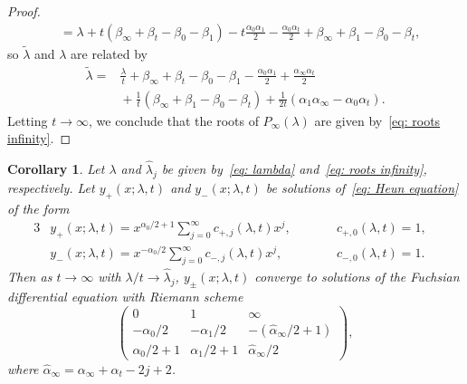 \documentclass[11pt]{article}
\numberwithin{equation}{section}
\numberwithin{equation}{section}
\newtheorem{Corollary}[Theorem]{Corollary}
\def\wt#1{\widetilde{#1}}
\begin{document}
\begin{proof}
\begin{align*}
 &{}=\lambda+t(\beta_\infty+\beta_t-\beta_0-\beta_1)-t\frac{\alpha_0\alpha_1}{2}
 -\frac{\alpha_0\alpha_t}{2}+\beta_\infty+\beta_1-\beta_0-\beta_t, \end{align*}
 so $\wt\lambda$ and $\lambda$ are related by
 {\allowdisplaybreaks
 \begin{align*}
 \wt\lambda={}&\frac\lambda t+\beta_\infty+\beta_t-\beta_0-\beta_1
 -\frac{\alpha_0\alpha_1}2+\frac{\alpha_\infty\alpha_t}2 \\
 &{}+\frac1t(\beta_\infty+\beta_1-\beta_0-\beta_t)
 +\frac1{2t}(\alpha_1\alpha_\infty-\alpha_0\alpha_t).
 \end{align*}
 }%
 Letting $t\to\infty$, we conclude that the roots of
 $P_\infty(\lambda)$ are given by~\eqref{eq: roots infinity}.
\end{proof}

\begin{Corollary}
 \label{corollary: limiting equations}
 Let $\lambda$ and $\hat\lambda_j$ be given by~\eqref{eq: lambda} and~\eqref{eq: roots infinity}, respectively.
 Let $y_+(x;\lambda,t)$ and $y_-(x;\lambda,t)$ be solutions of~\eqref{eq: Heun equation} of the form
\begin{alignat*}{3}
 & y_+(x;\lambda,t)=x^{\alpha_0/2+1}\sum_{j=0}^\infty
 c_{+,j}(\lambda,t)x^j, \qquad && c_{+,0}(\lambda,t)=1,&
\\
 & y_-(x;\lambda,t)=x^{-\alpha_0/2}\sum_{j=0}^\infty
 c_{-,j}(\lambda,t)x^j, \qquad && c_{-,0}(\lambda,t)=1.&
\end{alignat*}
 Then as $t\to\infty$ with $\lambda/t\to\hat\lambda_j$,
 $y_\pm(x;\lambda,t)$ converge to solutions of the Fuchsian
 differential equation with Riemann scheme
 \begin{equation} \label{eq: RS infinity}
 \begin{pmatrix}
 0 & 1 & \infty \\
 -\alpha_0/2 & -\alpha_1/2 & -(\hat\alpha_\infty/2+1) \\
 \alpha_0/2+1 & \alpha_1/2+1 & \hat\alpha_\infty/2
 \end{pmatrix},
 \end{equation}
 where $\hat\alpha_\infty=\alpha_\infty+\alpha_t-2j+2$.
\end{Corollary}
\end{document}
